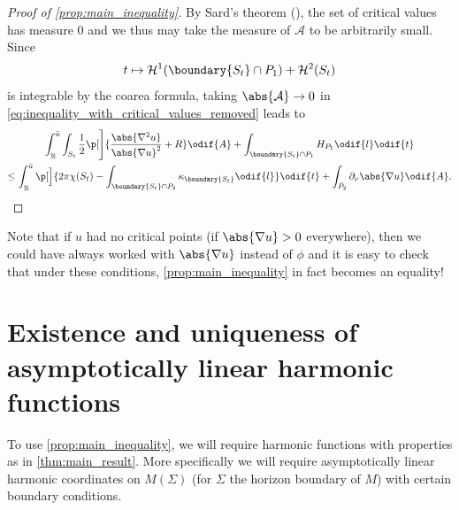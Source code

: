 \documentclass[titlepage,numbers=noenddot,oneside,%
cleardoublepage=empty,paper=a4,fontsize=11pt,%
english,%
]{scrartcl}
\begin{document}
{\begin{proof}[Proof of \cref{prop:main_inequality}]
    By Sard's theorem (\cite{sardMeasureCriticalValues1942}), the set of critical values has measure \( 0 \) and we thus may take the measure of \( \mathcal{A} \) to be arbitrarily small. Since
    \begin{equation*}
        t\mapsto \mathcal{H}^1(\boundary{S_t}\cap P_1)+\mathcal{H}^2(S_t)
    \end{equation*}
    is integrable by the coarea formula, taking \( \abs{\mathcal{A}}\to 0 \) in \cref{eq:inequality_with_critical_values_removed} leads to
    \begin{multline*}
        \int_{\minu}^{\maxu} \int_{S_t} \frac{1}{2}\p[\Bigg]{\frac{\abs{\nabla^2 u}}{\abs{\nabla u}^2}+R }\odif{A}+\int_{\boundary{S_t}\cap P_1}H_{P_1}\odif{l}\odif{t}\\
        \leq\int_{\minu}^{\maxu}\p[\Big]{2\pi \chi(S_t)-\int _{\boundary{S_t} \cap P_2}\kappa_{\boundary{S_t}}\odif{l}}\odif{t}+ \int_{\tilde{P}_2}\partial_{\nu} \abs{\nabla u}\odif{A}.
    \end{multline*} 
\end{proof}}
\begin{remark}\label{rem:no_critical_points_then_main_inequality_is_equality}
    Note that if \( u \) had no critical points (\ie if \( \abs{\nabla u}>0 \) everywhere), then we could have always worked with \( \abs{\nabla u} \) instead of \( \phi \) and it is easy to check that under these conditions, \cref{prop:main_inequality} in fact becomes an equality!
\end{remark}
\section{Existence and uniqueness of asymptotically linear harmonic functions}\label{sec:existence_and_uniqueness}
To use \cref{prop:main_inequality}, we will require harmonic functions with properties as in \cref{thm:main_result}. More specifically we will require asymptotically linear harmonic coordinates on \( M(\Sigma) \) (for \( \Sigma \) the horizon boundary of \( M \)) with certain boundary conditions.
\end{document}
